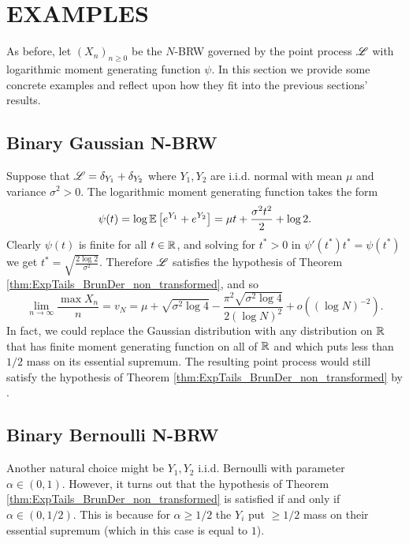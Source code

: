 \section{EXAMPLES}\label{sec:examples}
As before, let $(X_n)_{n \geq 0}$ be the $N$-BRW governed by the point process $\mathscr{L}$ with logarithmic moment generating function $\psi$. In this section we provide some concrete examples and reflect upon how they fit into the previous sections' results. 

\subsection{Binary Gaussian N-BRW}
Suppose that $\mathscr{L} = \delta_{Y_1} + \delta_{Y_2}$ where $Y_1, Y_2$ are i.i.d. normal with mean $\mu$ and variance $\sigma^2 > 0$. The logarithmic moment generating function takes the form
\begin{equation}
\psi(t) = \log \mathbb{E}\left[ e^{Y_1} + e^{Y_2} \right] = \mu t + \frac{\sigma^2 t^2}{2} + \log 2. 
\end{equation}
Clearly $\psi(t)$ is finite for all $t \in \mathbb{R}$, and solving for $t^* > 0$ in $\psi'(t^*) t^* = \psi(t^*)$ we get $t^* = \sqrt{\frac{2 \log 2}{\sigma^2}}$. Therefore $\mathscr{L}$ satisfies the hypothesis of Theorem \ref{thm:ExpTails_BrunDer_non_transformed}, and so 
\begin{equation}
\lim\limits_{n \to \infty} \frac{\max X_n}{n} = v_N = \mu + \sqrt{\sigma^2 \log 4} - \frac{\pi^2 \sqrt{\sigma^2 \log 4}}{2 (\log N)^2} + o((\log N)^{-2}). 
\end{equation}
In fact, we could replace the Gaussian distribution with any distribution on $\mathbb{R}$ that has finite moment generating function on all of $\mathbb{R}$ and which puts less than $1/2$ mass on its essential supremum. The resulting point process would still satisfy the hypothesis of Theorem \ref{thm:ExpTails_BrunDer_non_transformed} by \cite{jaffuel2227critical}. \\

\subsection{Binary Bernoulli N-BRW}
Another natural choice might be $Y_1, Y_2$ i.i.d. Bernoulli with parameter $\alpha \in (0, 1)$. However, it turns out that the hypothesis of Theorem \ref{thm:ExpTails_BrunDer_non_transformed} is satisfied if and only if $\alpha \in (0, 1/2)$. This is because for $\alpha \geq 1/2$ the $Y_i$ put $\geq 1/2$ mass on their essential supremum (which in this case is equal to $1$). \\

